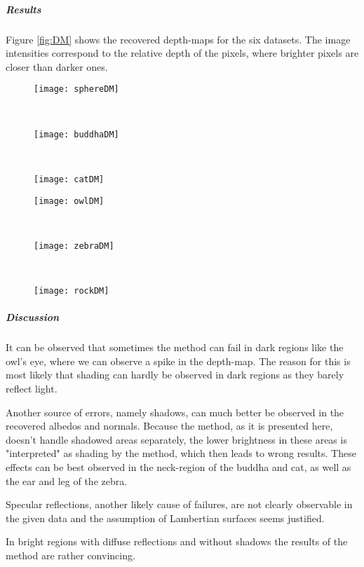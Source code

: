 \documentclass{paper}
\begin{document}
\subparagraph{Results} 
Figure \ref{fig:DM} shows the recovered depth-maps for the six datasets. The
image intensities correspond to the relative depth of the pixels,
where brighter pixels are closer than darker ones.
\begin{figure*}[h!]
    \centering
    \begin{subfigure}[]{0.33\textwidth}
        \centering
        \texttt{[image: sphereDM]}
    \end{subfigure}%
    ~ 
    \begin{subfigure}[]{0.33\textwidth}
        \centering
        \texttt{[image: buddhaDM]}
    \end{subfigure}%
    ~ 
    \begin{subfigure}[]{0.33\textwidth}
        \centering
        \texttt{[image: catDM]}
    \end{subfigure}
        \begin{subfigure}[]{0.33\textwidth}
        \centering
        \texttt{[image: owlDM]}
    \end{subfigure}%
    ~ 
    \begin{subfigure}[]{0.33\textwidth}
        \centering
        \texttt{[image: zebraDM]}
    \end{subfigure}%
    ~ 
    \begin{subfigure}[]{0.33\textwidth}
        \centering
        \texttt{[image: rockDM]}
    \end{subfigure}
    \caption{Recovered depth-maps}    
\label{fig:DM}
\end{figure*}

\subparagraph{Discussion} 
It can be observed that sometimes the method can fail in dark regions like the owl's eye, where we can observe a spike in the depth-map. The reason for this is most likely that shading can hardly be observed in dark regions as they barely reflect light. 

Another source of errors, namely shadows, can much better be observed in the recovered albedos and normals. Because the method, as it is presented here, doesn't handle shadowed areas separately, the lower brightness in these areas is "interpreted" as shading by the method, which then leads to wrong results. These effects can be best observed in the neck-region of the buddha and cat, as well as the ear and leg of the zebra. 

Specular reflections, another likely cause of failures, are not clearly observable in the given data and the assumption of Lambertian surfaces seems justified. 

In bright regions with diffuse reflections and without shadows the results of the method are rather convincing. 

 
\end{document}
